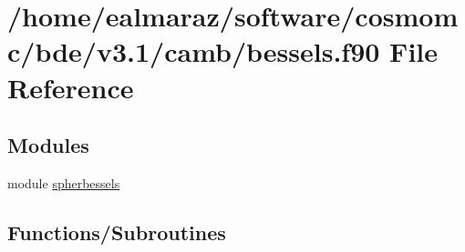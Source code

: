 \hypertarget{bessels_8f90}{}\section{/home/ealmaraz/software/cosmomc/bde/v3.1/camb/bessels.f90 File Reference}
\label{bessels_8f90}
\subsection*{Modules}
\begin{DoxyCompactItemize}
\item 
module \mbox{\hyperlink{namespacespherbessels}{spherbessels}}
\end{DoxyCompactItemize}
\subsection*{Functions/\+Subroutines}
